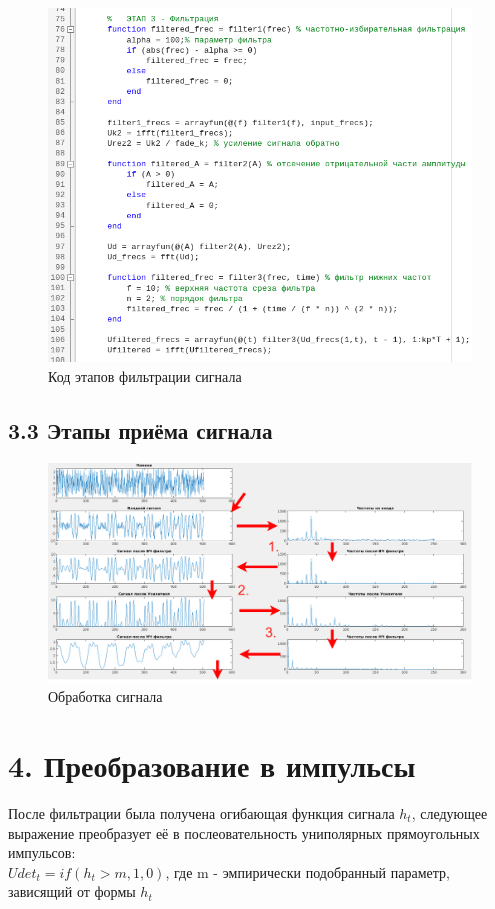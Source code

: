 \documentclass[12pt]{article}
\begin{document}
	\begin{figure}[!h]
		\centering
		\includegraphics[width=0.92\linewidth]{code_filtering.png}
		\caption{Код этапов фильтрации сигнала}
	\end{figure}
	
 
  \subsection*{3.3 Этапы приёма сигнала}
  	\begin{figure}[!h]
		\centering
		\includegraphics[width=1.2\linewidth]{graph_input_colored.png}
		\caption{Обработка сигнала}
	\end{figure}

\newpage
 \section*{4. Преобразование в импульсы}
 	После фильтрации была получена огибающая функция сигнала $h_t$, следующее выражение преобразует её в послеовательность униполярных прямоугольных импульсов:\\
 	$Udet_t = if (h_t > m, 1, 0)$, где m - эмпирически подобранный параметр, зависящий от формы $h_t$
 	
\end{document}
